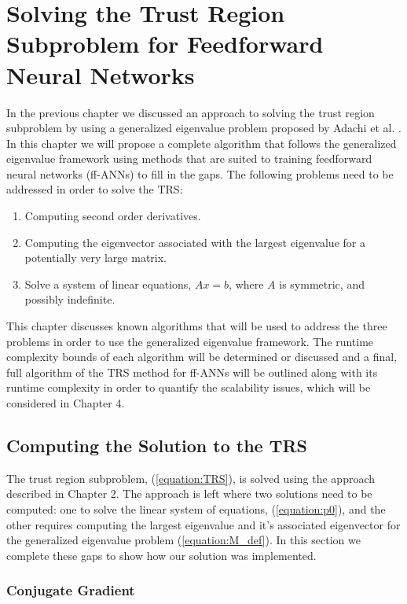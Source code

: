 \documentclass[letterpaper,12pt,titlepage,oneside,final]{book}
\begin{document}
	\chapter{Solving the Trust Region Subproblem for Feedforward Neural Networks}
	In the previous chapter we discussed an approach to solving the trust region subproblem by using a generalized eigenvalue problem proposed by Adachi et al. \cite{adachi.paper}. In this chapter we will propose a complete algorithm that follows the generalized eigenvalue framework using methods that are suited to training feedforward neural networks (ff-ANNs) to fill in the gaps. The following problems need to be addressed in order to solve the TRS:
	\begin{enumerate}
		\item Computing second order derivatives.
		\item Computing the eigenvector associated with the largest eigenvalue for a potentially very large matrix.
		\item Solve a system of linear equations, $Ax=b$, where $A$ is symmetric, and possibly indefinite. 
	\end{enumerate}
	This chapter discusses known algorithms that will be used to address the three problems in order to use the generalized eigenvalue framework. The runtime complexity bounds of each algorithm will be determined or discussed and a final, full algorithm of the TRS method for ff-ANNs will be outlined along with its runtime complexity in order to quantify the scalability issues, which will be considered in Chapter 4.
	
	
	\section{Computing the Solution to the TRS}
	
	The trust region subproblem, (\ref{equation:TRS}), is solved using the approach described in Chapter 2. The approach is left where two solutions need to be computed: one to solve the linear system of equations, (\ref{equation:p0}), and the other requires computing the largest eigenvalue and it's associated eigenvector for the generalized eigenvalue problem (\ref{equation:M_def}). In this section we complete these gaps to show how our solution was implemented.
	
	\subsection{Conjugate Gradient}
	
\end{document}
